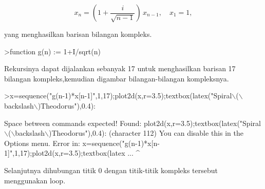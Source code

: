 \documentclass[12pt,arial,letterpaper]{book}
\begin{document}
\begin{eulernootebook}
\begin{eulercomment}
\begin{eulercomment}
\begin{eulernootebook}
\begin{eulercomment}
\begin{eulercomment}
\begin{eulercomment}
\begin{eulercomment}
\begin{eulercomment}
\begin{eulercomment}
\begin{eulernotebook}
\begin{eulercomment}
\begin{eulercomment}
\begin{eulercomment}
\begin{eulercomment}
\begin{eulercomment}
\begin{eulercomment}
\begin{eulercomment}
\begin{eulercomment}
\begin{eulercomment}
\begin{eulercomment}
\begin{eulercomment}
\begin{eulercomment}
\begin{eulercomment}
\begin{eulercomment}
\begin{eulercomment}
\begin{eulercomment}
\begin{eulercomment}
\begin{eulercomment}
\begin{eulercomment}
\begin{eulercomment}
\begin{eulercomment}
\begin{eulercomment}
\begin{eulercomment}
\begin{eulercomment}
\begin{eulercomment}
\begin{eulercomment}
\begin{eulercomment}
\begin{eulercomment}
\begin{eulercomment}
\end{eulercomment}
\begin{eulerformula}
\[
x_n = \left( 1 + \frac{i}{\sqrt{n-1}} \right) \, x_{n-1}, \quad x_1=1,
\]
\end{eulerformula}
\begin{eulercomment}
yang menghasilkan barisan bilangan kompleks.
\end{eulercomment}
\begin{eulerprompt}
>function g(n) := 1+I/sqrt(n)
\end{eulerprompt}
\begin{eulercomment}
Rekursinya dapat dijalankan sebanyak 17 untuk menghasilkan barisan 17
bilangan kompleks,kemudian digambar bilangan-bilangan kompleksnya.
\end{eulercomment}
\begin{eulerprompt}
>x=sequence("g(n-1)*x[n-1]",1,17);plot2d(x,r=3.5);textbox(latex("Spiral\(\backslash\)(\(\backslash\)backslash\(\backslash\))Theodorus"),0.4):
\end{eulerprompt}
\begin{euleroutput}
  Space between commands expected!
  Found: plot2d(x,r=3.5);textbox(latex("Spiral\(\backslash\)(\(\backslash\)backslash\(\backslash\))Theodorus"),0.4): (character 112)
  You can disable this in the Options menu.
  Error in:
  x=sequence("g(n-1)*x[n-1]",1,17);plot2d(x,r=3.5);textbox(latex ...
                                   ^
\end{euleroutput}
\begin{eulercomment}
Selanjutnya dihubungan titik 0 dengan titik-titik kompleks tersebut
menggunakan loop.
\end{eulercomment}

\end{eulercomment}
\end{eulercomment}
\end{eulercomment}
\end{eulercomment}
\end{eulercomment}
\end{eulercomment}
\end{eulercomment}
\end{eulercomment}
\end{eulercomment}
\end{eulercomment}
\end{eulercomment}
\end{eulercomment}
\end{eulercomment}
\end{eulercomment}
\end{eulercomment}
\end{eulercomment}
\end{eulercomment}
\end{eulercomment}
\end{eulercomment}
\end{eulercomment}
\end{eulercomment}
\end{eulercomment}
\end{eulercomment}
\end{eulercomment}
\end{eulercomment}
\end{eulercomment}
\end{eulercomment}
\end{eulercomment}
\end{eulernotebook}
\end{eulercomment}
\end{eulercomment}
\end{eulercomment}
\end{eulercomment}
\end{eulercomment}
\end{eulercomment}
\end{eulernootebook}
\end{eulercomment}
\end{eulercomment}
\end{eulernootebook}
\end{document}
